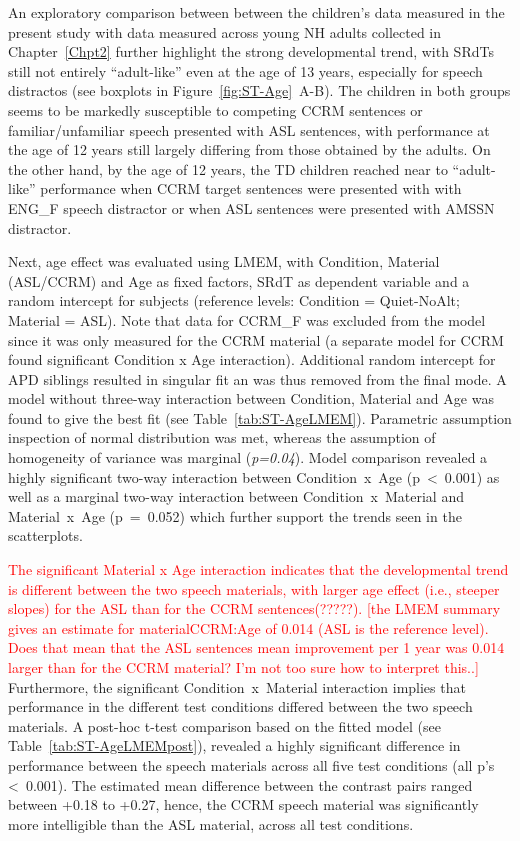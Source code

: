 \documentclass[a4paper, twoside]{templates/ociamthesis}
\begin{document}
An exploratory comparison between between the children's data measured in the present study with data measured across young NH adults collected in Chapter~\ref{Chpt2} further highlight the strong developmental trend, with SRdTs still not entirely ``adult-like'' even at the age of 13 years, especially for speech distractos (see boxplots in Figure~\ref{fig:ST-Age}~A-B). The children in both groups seems to be markedly susceptible to competing CCRM sentences or familiar/unfamiliar speech presented with ASL sentences, with performance at the age of 12 years still largely differing from those obtained by the adults. On the other hand, by the age of 12 years, the TD children reached near to ``adult-like'' performance when CCRM target sentences were presented with with ENG\_F speech distractor or when ASL sentences were presented with AMSSN distractor.

Next, age effect was evaluated using LMEM, with Condition, Material (ASL/CCRM) and Age as fixed factors, SRdT as dependent variable and a random intercept for subjects (reference levels: Condition = Quiet-NoAlt; Material = ASL).
Note that data for CCRM\_F was excluded from the model since it was only measured for the CCRM material \colorbox[HTML]{CCCCFF}{(a separate model for CCRM found significant Condition x Age interaction)}. Additional random intercept for APD siblings resulted in singular fit an was thus removed from the final mode. A model without three-way interaction between Condition, Material and Age was found to give the best fit (see Table~\ref{tab:ST-AgeLMEM}). Parametric assumption inspection of normal distribution was met, whereas the assumption of homogeneity of variance was marginal (\emph{p=0.04}). Model comparison revealed a highly significant two-way interaction between Condition~x~Age (p~\textless~0.001) as well as a marginal two-way interaction between Condition~x~Material and Material~x~Age (p~=~0.052) which further support the trends seen in the scatterplots.

\textcolor{red}{The significant Material x Age interaction indicates that the developmental trend is different between the two speech materials, with larger age effect (i.e., steeper slopes) for the ASL than for the CCRM sentences(?????). [the LMEM summary gives an estimate for materialCCRM:Age of 0.014 (ASL is the reference level). Does that mean that the ASL sentences mean improvement per 1 year was 0.014 larger than for the CCRM material? I'm not too sure how to interpret this..]} Furthermore, the significant Condition~x~Material interaction implies that performance in the different test conditions differed between the two speech materials. A post-hoc t-test comparison based on the fitted model (see Table~\ref{tab:ST-AgeLMEMpost}), revealed a highly significant difference in performance between the speech materials across all five test conditions (all p's \textless~0.001). The estimated mean difference between the contrast pairs ranged between +0.18 to +0.27, hence, the CCRM speech material was significantly more intelligible than the ASL material, across all test conditions.
\end{document}
